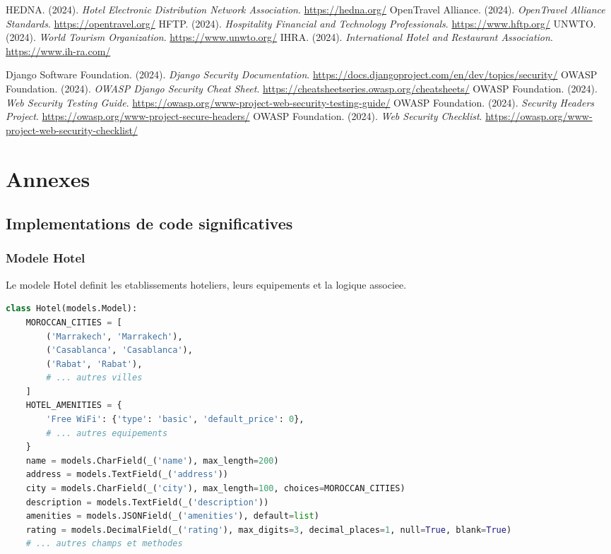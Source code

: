 \documentclass[12pt,a4paper]{report}
\begin{document}
\begin{thebibliography}{99}
 HEDNA. (2024). \textit{Hotel Electronic Distribution Network Association}. \url{https://hedna.org/}
 OpenTravel Alliance. (2024). \textit{OpenTravel Alliance Standards}. \url{https://opentravel.org/}
 HFTP. (2024). \textit{Hospitality Financial and Technology Professionals}. \url{https://www.hftp.org/}
 UNWTO. (2024). \textit{World Tourism Organization}. \url{https://www.unwto.org/}
 IHRA. (2024). \textit{International Hotel and Restaurant Association}. \url{https://www.ih-ra.com/}

 Django Software Foundation. (2024). \textit{Django Security Documentation}. \url{https://docs.djangoproject.com/en/dev/topics/security/}
 OWASP Foundation. (2024). \textit{OWASP Django Security Cheat Sheet}. \url{https://cheatsheetseries.owasp.org/cheatsheets/}
 OWASP Foundation. (2024). \textit{Web Security Testing Guide}. \url{https://owasp.org/www-project-web-security-testing-guide/}
 OWASP Foundation. (2024). \textit{Security Headers Project}. \url{https://owasp.org/www-project-secure-headers/}
 OWASP Foundation. (2024). \textit{Web Security Checklist}. \url{https://owasp.org/www-project-web-security-checklist/}

\end{thebibliography}

\chapter{Annexes}

\section{Implementations de code significatives}

\subsection{Modele Hotel}
Le modele Hotel definit les etablissements hoteliers, leurs equipements et la logique associee.
\begin{lstlisting}[language=Python]
class Hotel(models.Model):
    MOROCCAN_CITIES = [
        ('Marrakech', 'Marrakech'),
        ('Casablanca', 'Casablanca'),
        ('Rabat', 'Rabat'),
        # ... autres villes
    ]
    HOTEL_AMENITIES = {
        'Free WiFi': {'type': 'basic', 'default_price': 0},
        # ... autres equipements
    }
    name = models.CharField(_('name'), max_length=200)
    address = models.TextField(_('address'))
    city = models.CharField(_('city'), max_length=100, choices=MOROCCAN_CITIES)
    description = models.TextField(_('description'))
    amenities = models.JSONField(_('amenities'), default=list)
    rating = models.DecimalField(_('rating'), max_digits=3, decimal_places=1, null=True, blank=True)
    # ... autres champs et methodes
\end{lstlisting}
\end{document}
